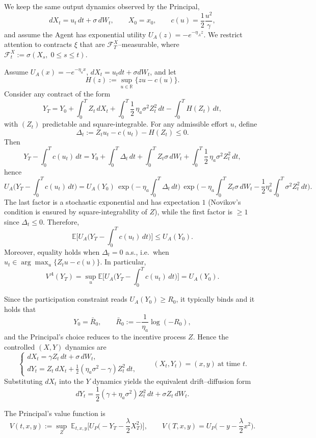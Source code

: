 \documentclass[a4paper,10pt]{article}
\newcommand{\E}{\mathbb{E}}
\theoremstyle{definition}
\theoremstyle{plain}
\numberwithin{equation}{section}
\newcommand{\hs}{\vspace{3mm}}
\begin{document}
We keep the same output dynamics observed by the Principal,
\[
dX_t = u_t\,dt + \sigma\,dW_t,\qquad X_0=x_0,
\qquad
c(u)=\frac12\frac{u^2}{\gamma},
\]
and assume the Agent has exponential utility $U_A(z)=-e^{-\eta_A z}$.
We restrict attention to contracts $\xi$ that are $\mathcal F_T^X$--measurable, where
$\mathcal F_t^X:=\sigma(X_s,\;0\le s\le t)$.

\hs

Assume $U_A(x)=-e^{-\eta_a x}$, $dX_t=u_tdt+\sigma dW_t$, and let
\[
H(z):=\sup_{u\in\mathbb R}\{zu-c(u)\}.
\]
Consider any contract of the form
\[
Y_T
=
Y_0+\int_0^T Z_t\,dX_t +\int_0^T \frac12\,\eta_a\sigma^2 Z_t^2\,dt -\int_0^T H(Z_t)\,dt,
\]
with $(Z_t)$ predictable and square-integrable. For any admissible effort $u$, define
\[
\Delta_t:=Z_tu_t-c(u_t)-H(Z_t)\le 0.
\]
Then
\[
Y_T-\int_0^T c(u_t)\,dt
=
Y_0+\int_0^T \Delta_t\,dt+\int_0^T Z_t\sigma\,dW_t+\int_0^T \frac12\,\eta_a\sigma^2 Z_t^2\,dt,
\]
hence
\[
U_A\Big(Y_T-\int_0^T c(u_t)\,dt\Big)
=
U_A(Y_0)\,
\exp\Big(-\eta_a\int_0^T \Delta_t\,dt\Big)\,
\exp\Big(-\eta_a\int_0^T Z_t\sigma\,dW_t-\frac12\eta_a^2\int_0^T \sigma^2 Z_t^2\,dt\Big).
\]
The last factor is a stochastic exponential and has expectation $1$ (Novikov's condition is ensured by
square-integrability of $Z$), while the first factor is $\ge 1$ since $\Delta_t\le 0$. Therefore,
\[
\E\Big[U_A\Big(Y_T-\int_0^T c(u_t)\,dt\Big)\Big]\le U_A(Y_0).
\]
Moreover, equality holds when $\Delta_t=0$ a.s., i.e.\ when $u_t\in\arg\max_{u}\{Z_tu-c(u)\}$. In particular,
\[
V^A(Y_T)=\sup_u\E\Big[U_A\Big(Y_T-\int_0^T c(u_t)\,dt\Big)\Big]=U_A(Y_0).
\]

\hs

Since the participation constraint reads $U_A(Y_0)\ge R_0$, it typically binds and it holds that
\[
Y_0=\bar R_0,
\qquad
\bar R_0:=-\frac{1}{\eta_a}\log(-R_0),
\]
and the Principal's choice reduces to the incentive process $Z$. Hence the controlled $(X,Y)$ dynamics are
\[
\begin{cases}
dX_t=\gamma Z_t\,dt+\sigma\,dW_t,\\[4pt]
dY_t=Z_t\,dX_t+\frac12(\eta_a\sigma^2-\gamma)Z_t^2\,dt,
\end{cases}
\qquad (X_t,Y_t)=(x,y)\ \text{at time }t.
\]
Substituting $dX_t$ into the $Y$ dynamics yields the equivalent drift--diffusion form
\[
dY_t=\frac12(\gamma+\eta_a\sigma^2)Z_t^2\,dt+\sigma Z_t\,dW_t.
\]

The Principal's value function is
\[
V(t,x,y)
:=
\sup_{Z}\;
\E_{t,x,y}\Big[
U_P\Big(-Y_T-\frac{\lambda}{2}X_T^2\Big)
\Big],
\qquad
V(T,x,y)=U_P\Big(-y-\frac{\lambda}{2}x^2\Big).
\]
\end{document}

